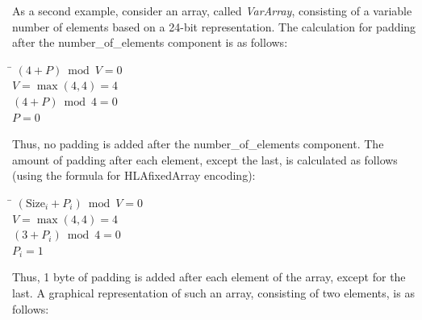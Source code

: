 \begin{center}
    \begingroup\fontsize{7.35}{8.45}\selectfont\setlength{\tabcolsep}{4.05pt}\renewcommand{\arraystretch}{1.36}
    \endgroup
\end{center}

As a second example, consider an array, called \textit{VarArray}, consisting of a variable number of elements based on a 24-bit representation. The calculation for padding after the number\_of\_elements component is as follows:

\begin{tabbing}
    \hspace{18pt}\=\kill
    \> $(4+P) \bmod V = 0$\\
    \> $V = \max(4,4) = 4$\\
    \> $(4+P) \bmod 4 = 0$\\
    \> $P=0$
\end{tabbing}

Thus, no padding is added after the number\_of\_elements component. The amount of padding after each element, except the last, is calculated as follows (using the formula for HLAfixedArray encoding):

\begin{tabbing}
    \hspace{18pt}\=\kill
    \> $(\mathrm{Size}_i + P_i) \bmod V = 0$\\
    \> $V = \max(4,4) = 4$\\
    \> $(3+P_i) \bmod 4 = 0$\\
    \> $P_i = 1$
\end{tabbing}

Thus, 1 byte of padding is added after each element of the array, except for the last. A graphical representation of such an array, consisting of two elements, is as follows:

\begin{center}
    \begingroup\fontsize{7.5}{8.6}\selectfont\setlength{\tabcolsep}{5.3pt}\renewcommand{\arraystretch}{1.36}
    \endgroup
\end{center}

